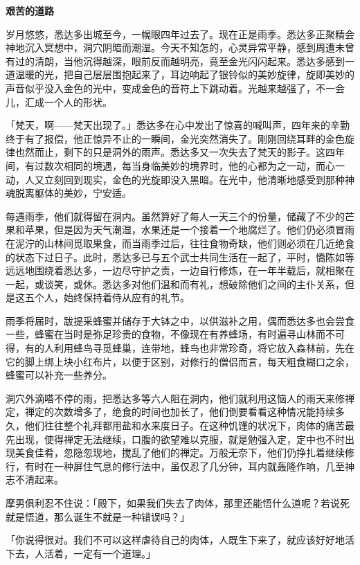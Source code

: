\documentclass[twoside,openany]{book}
\newcommand{\mt}[1]{\textbullet \textbf{#1}}
\begin{document}
\mt{艰苦的道路}

岁月悠悠，悉达多出城至今，一幌眼四年过去了。现在正是雨季。悉达多正聚精会神地沉入冥想中，洞穴阴暗而潮湿。今天不知怎的，心灵异常平静，感到周遭未曾有过的清朗，当他沉得越深，眼前反而越明亮，竟至金光闪闪起来。悉达多感到一道温暖的光，把自己层层围抱起来了，耳边响起了银铃似的美妙旋律，旋即美妙的声音似乎没入金色的光中，变成金色的音符上下跳动着。光越来越强了，不一会儿，汇成一个人的形状。

「梵天，啊——梵天出现了。」悉达多在心中发出了惊喜的喊叫声，四年来的辛勤终于有了报偿，他正惊异不止的一瞬间，金光突然消失了。刚刚回绕耳畔的金色旋律也然而止，剩下的只是洞外的雨声。悉达多又一次失去了梵天的影子。这四年间，有过数次相同的境遇，每当身临美妙的境界时，他的心都为之一动，而心一动，人又立刻回到现实，金色的光旋即没入黑暗。在光中，他清晰地感受到那种神魂脱离躯体的美妙，宁安适。

每遇雨季，他们就得留在洞内。虽然算好了每人一天三个的份量，储藏了不少的芒果和苹果，但是因为天气潮湿，水果还是一个接着一个地腐烂了。他们仍必须冒雨在泥泞的山林间觅取果食，而当雨季过后，往往食物奇缺，他们则必须在几近绝食的状态下过日子。此时，悉达多已与五个武士共同生活在一起了，平时，憍陈如等远远地围绕着悉达多，一边尽守护之责，一边自行修炼，在一年半载后，就相聚在一起，或谈笑，或休。悉达多对他们温和而有礼，想破除他们之间的主仆关系，但是这五个人，始终保持着侍从应有的礼节。

雨季将届时，跋提采蜂蜜并储存于大钵之中，以供滋补之用，偶而悉达多也会尝食一些，蜂蜜在当时是弥足珍贵的食物，不像现在有养蜂场，有时遍寻山林而不可得，有的人利用蜂鸟寻觅蜂巢，连带地，蜂鸟也非常珍奇，将它放入森林前，先在它的脚上绑上块小红布片，以便于区别，对修行的僧侣而言，每天粗食糊口之余，蜂蜜可以补充一些养分。

洞穴外滴嗒不停的雨，把悉达多等六人阻在洞内，他们就利用这恼人的雨天来修禅定，禅定的次数增多了，绝食的时间也加长了，他们倒要看看这种情况能持续多久，他们往往整个礼拜都用盐和水来度日子。在这种饥馑的状况下，肉体的痛苦最先出现，使得禅定无法继续，口腹的欲望难以克服，就是勉强入定，定中也不时出现美食佳肴，忽隐忽现地，搅乱了他们的禅定。万般无奈下，他们仍挣扎着继续修行，有时在一种屏住气息的修行法中，虽仅忍了几分钟，耳内就轰隆作响，几至神志不清起来。

摩男俱利忍不住说：「殿下，如果我们失去了肉体，那里还能悟什么道呢？若说死就是悟道，那么诞生不就是一种错误吗？」

「你说得很对。我们不可以这样虐待自己的肉体，人既生下来了，就应该好好地活下去，人活着，一定有一个道理。」
\end{document}
